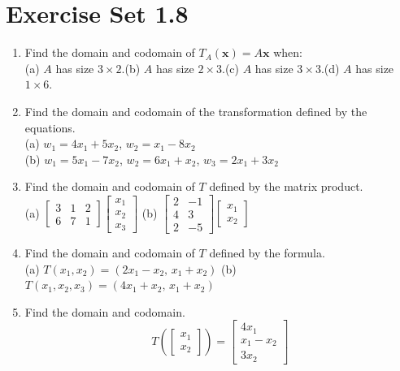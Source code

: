 \documentclass{article}
\theoremstyle{mystyle}
\begin{document}
\section*{Exercise Set 1.8}
\begin{enumerate}
\item[1.] Find the domain and codomain of $T_A(\mathbf{x})=A\mathbf{x}$ when:\\
(a) $A$ has size $3\times2$.\quad (b) $A$ has size $2\times3$.\quad (c) $A$ has size $3\times3$.\quad (d) $A$ has size $1\times6$.

\item[3.] Find the domain and codomain of the transformation defined by the equations.\\
(a) $w_1=4x_1+5x_2$,\; $w_2=x_1-8x_2$\\
(b) $w_1=5x_1-7x_2$,\; $w_2=6x_1+x_2$,\; $w_3=2x_1+3x_2$

\item[5.] Find the domain and codomain of $T$ defined by the matrix product.\\
(a) $\begin{bmatrix}3&1&2\\6&7&1\end{bmatrix}\begin{bmatrix}x_1\\x_2\\x_3\end{bmatrix}$\qquad
(b) $\begin{bmatrix}2&-1\\4&3\\2&-5\end{bmatrix}\begin{bmatrix}x_1\\x_2\end{bmatrix}$

\item[7.] Find the domain and codomain of $T$ defined by the formula.\\
(a) $T(x_1,x_2)=(2x_1-x_2,\,x_1+x_2)$\quad
(b) $T(x_1,x_2,x_3)=(4x_1+x_2,\,x_1+x_2)$

\item[9.] Find the domain and codomain.
\[
T\!\left(\begin{bmatrix}x_1\\x_2\end{bmatrix}\right)=\begin{bmatrix}4x_1\\x_1-x_2\\3x_2\end{bmatrix}
\]


\end{enumerate}
\end{document}
